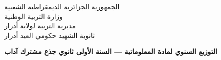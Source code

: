 \documentclass[10pt, a4paper, landscape]{article}
\begin{document}
\begin{center}
  {\small\color{secondary} الجمهورية الجزائرية الديمقراطية الشعبية} \\[1pt]
  {\small\color{secondary} وزارة التربية الوطنية} \\[1pt]
  {\small\color{secondary} مديرية التربية لولاية أدرار} \\[1pt]
  {\small\color{secondary} ثانوية الشهيد حكومي العيد أدرار} \\[3pt]
\end{center}


\begin{center}
  {\large\bfseries\color{primary} التوزيع السنوي لمادة المعلوماتية — السنة الأولى ثانوي  جذع مشترك آداب}
\end{center}

\vspace{3pt}
\end{document}
